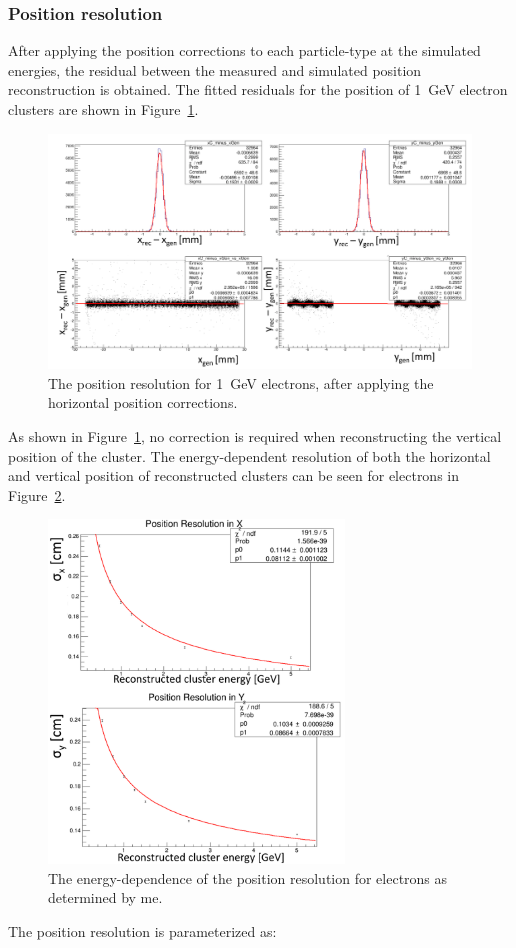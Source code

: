 \subsubsection{Position resolution}

After applying the position corrections to each particle-type at the simulated energies, the residual between the measured and simulated position reconstruction is obtained. The fitted residuals for the position of 1~GeV electron clusters are shown in Figure~\ref{Figure:corrPosnsFits}.
\begin{figure}[htb]
  \centering
      \includegraphics[width=1.0\textwidth]{pics/performance/corrPosnsFits.png}
  \caption[Position resolution for 1~GeV electrons.]{The position resolution for 1~GeV electrons, after applying the horizontal position corrections.}
  \label{Figure:corrPosnsFits}
\end{figure}
As shown in Figure~\ref{Figure:corrPosnsFits}, no correction is required when reconstructing the vertical position of the cluster. The energy-dependent resolution of both the horizontal and vertical position of reconstructed clusters can be seen for electrons in Figure~\ref{Figure:emPosnResn}. 
\begin{figure}[htb]
  \centering
      \includegraphics[width=0.7\textwidth]{pics/performance/emPosnResn.png}
  \caption[Energy-dependent position resolution for electrons.]{The energy-dependence of the position resolution for electrons as determined by me.}
  \label{Figure:emPosnResn}
\end{figure}
The position resolution is parameterized as:
 

